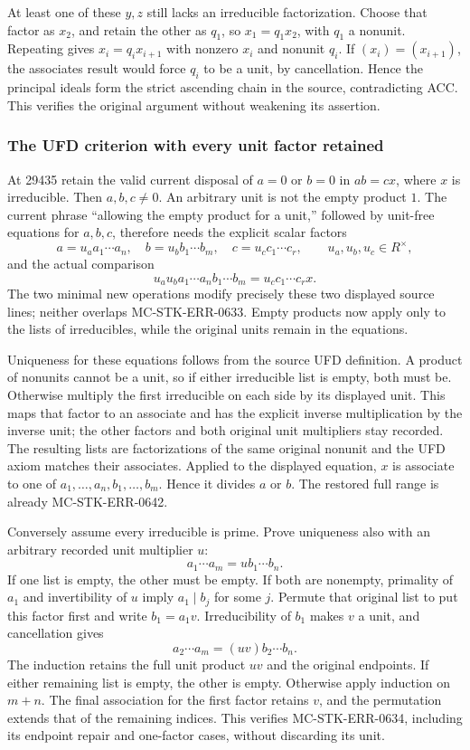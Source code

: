 At least one of these \(y,z\) still lacks an irreducible factorization. Choose that factor as \(x_2\), and retain the other as \(q_1\), so \(x_1=q_1x_2\), with \(q_1\) a nonunit. Repeating gives \(x_i=q_i x_{i+1}\) with nonzero \(x_i\) and nonunit \(q_i\). If \((x_i)=(x_{i+1})\), the associates result would force \(q_i\) to be a unit, by cancellation. Hence the principal ideals form the strict ascending chain in the source, contradicting ACC. This verifies the original argument without weakening its assertion.

\subsubsection{The UFD criterion with every unit factor retained}\label{the-ufd-criterion-with-every-unit-factor-retained}

At 29435 retain the valid current disposal of \(a=0\) or \(b=0\) in \(ab=cx\), where \(x\) is irreducible. Then \(a,b,c\ne0\). An arbitrary unit is not the empty product \(1\). The current phrase ``allowing the empty product for a unit,'' followed by unit-free equations for \(a,b,c\), therefore needs the explicit scalar factors \[
 a=u_a a_1\cdots a_n,\quad
 b=u_b b_1\cdots b_m,\quad
 c=u_c c_1\cdots c_r,\qquad u_a,u_b,u_c\in R^\times,
\] and the actual comparison \[
 u_a u_b a_1\cdots a_n b_1\cdots b_m
       =u_c c_1\cdots c_r x.
\] The two minimal new operations modify precisely these two displayed source lines; neither overlaps MC-STK-ERR-0633. Empty products now apply only to the lists of irreducibles, while the original units remain in the equations.

Uniqueness for these equations follows from the source UFD definition. A product of nonunits cannot be a unit, so if either irreducible list is empty, both must be. Otherwise multiply the first irreducible on each side by its displayed unit. This maps that factor to an associate and has the explicit inverse multiplication by the inverse unit; the other factors and both original unit multipliers stay recorded. The resulting lists are factorizations of the same original nonunit and the UFD axiom matches their associates. Applied to the displayed equation, \(x\) is associate to one of \(a_1,\ldots,a_n,b_1,\ldots,b_m\). Hence it divides \(a\) or \(b\). The restored full range is already MC-STK-ERR-0642.

Conversely assume every irreducible is prime. Prove uniqueness also with an arbitrary recorded unit multiplier \(u\): \[
 a_1\cdots a_m=u b_1\cdots b_n.
\] If one list is empty, the other must be empty. If both are nonempty, primality of \(a_1\) and invertibility of \(u\) imply \(a_1\mid b_j\) for some \(j\). Permute that original list to put this factor first and write \(b_1=a_1v\). Irreducibility of \(b_1\) makes \(v\) a unit, and cancellation gives \[
 a_2\cdots a_m=(uv)b_2\cdots b_n.
\] The induction retains the full unit product \(uv\) and the original endpoints. If either remaining list is empty, the other is empty. Otherwise apply induction on \(m+n\). The final association for the first factor retains \(v\), and the permutation extends that of the remaining indices. This verifies MC-STK-ERR-0634, including its endpoint repair and one-factor cases, without discarding its unit.

